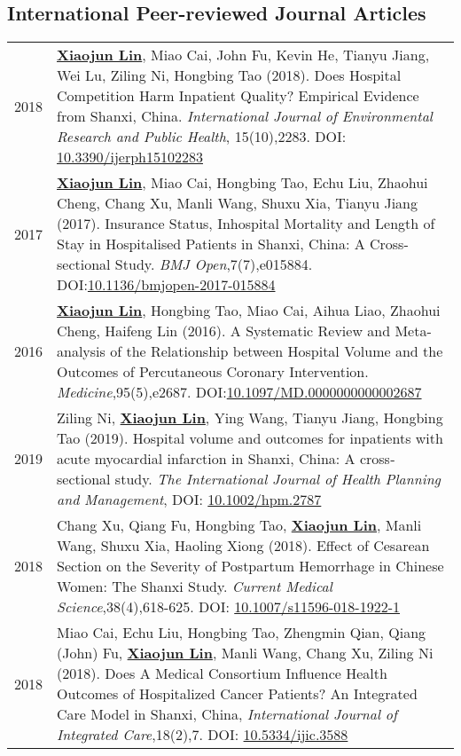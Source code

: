 \documentclass[a4paper,10pt]{article}
\begin{document}
\subsection*{International Peer-reviewed Journal Articles}
\begin{longtable}{r p{13cm}}

2018 & \underline{\textbf{Xiaojun Lin}}, Miao Cai, John Fu, Kevin He, Tianyu Jiang, Wei Lu, Ziling Ni, Hongbing Tao (2018). Does Hospital Competition Harm Inpatient Quality? Empirical Evidence from Shanxi, China. \emph{International Journal of Environmental Research and Public Health}, 15(10),2283. DOI: \href{https://doi.org/10.3390/ijerph15102283}{10.3390/ijerph15102283}\\[5pt]

2017 &  \underline{\textbf{Xiaojun Lin}}, Miao Cai, Hongbing Tao, Echu Liu, Zhaohui Cheng, Chang Xu, Manli Wang, Shuxu Xia, Tianyu Jiang (2017). Insurance Status, Inhospital Mortality and Length of Stay in Hospitalised Patients in Shanxi, China: A Cross-sectional Study. \emph{BMJ Open},7(7),e015884. DOI:\href{https://doi.org/10.1136/bmjopen-2017-015884}{10.1136/bmjopen-2017-015884}\\[5pt]

2016 &  \underline{\textbf{Xiaojun Lin}}, Hongbing Tao, Miao Cai, Aihua Liao, Zhaohui Cheng, Haifeng Lin (2016). A Systematic Review and Meta-analysis of the Relationship between Hospital Volume and the Outcomes of Percutaneous Coronary Intervention.  \emph{Medicine},95(5),e2687. DOI:\href{https://doi.org/10.1097/MD.0000000000002687}{10.1097/MD.0000000000002687}\\[5pt]

2019 & Ziling Ni,  \underline{\textbf{Xiaojun Lin}},  Ying Wang,  Tianyu Jiang,  Hongbing Tao (2019). Hospital volume and outcomes for inpatients with acute myocardial infarction in Shanxi, China: A cross‐sectional study. \emph{The International Journal of Health Planning and Management}, DOI: \href{https://doi.org/10.1002/hpm.2787}{10.1002/hpm.2787}\\[5pt]

2018 & Chang Xu, Qiang Fu, Hongbing Tao, \underline{\textbf{Xiaojun Lin}}, Manli Wang, Shuxu Xia, Haoling Xiong (2018). Effect of Cesarean Section on the Severity of Postpartum Hemorrhage in Chinese Women: The Shanxi Study. \emph{Current Medical Science},38(4),618-625. DOI: \href{https://doi.org/10.1007/s11596-018-1922-1}{10.1007/s11596-018-1922-1}\\[5pt]


2018 & Miao Cai, Echu Liu, Hongbing Tao, Zhengmin Qian, Qiang (John) Fu, \underline{\textbf{Xiaojun Lin}}, Manli Wang, Chang Xu, Ziling Ni (2018). Does A Medical Consortium Influence Health Outcomes of Hospitalized Cancer Patients? An Integrated Care Model in Shanxi, China, \emph{International Journal of Integrated Care},18(2),7. DOI: \href{https://doi.org/10.5334/ijic.3588}{10.5334/ijic.3588}\\[5pt]


\end{longtable}
\end{document}
